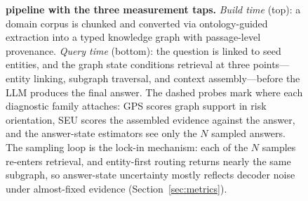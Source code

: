 \begin{figure}[t]
\caption{%
  \textbf{\system{} pipeline with the three measurement taps.}
  \emph{Build time} (top): a domain corpus is chunked and converted via
  ontology-guided extraction into a typed knowledge graph with passage-level
  provenance.
  \emph{Query time} (bottom): the question is linked to seed entities, and the
  graph state conditions retrieval at three points---entity linking, subgraph
  traversal, and context assembly---before the LLM produces the final answer.
  The dashed probes mark where each diagnostic family attaches: GPS scores
  graph support in risk orientation, SEU scores the assembled evidence against
  the answer, and the answer-state estimators see only the $N$ sampled answers.
  The sampling loop is the lock-in mechanism: each of the $N$ samples re-enters
  retrieval, and entity-first routing returns nearly the same subgraph, so
  answer-state uncertainty mostly reflects decoder noise under almost-fixed
  evidence (Section~\ref{sec:metrics}).%
}
\label{fig:pipeline}
\end{figure}
